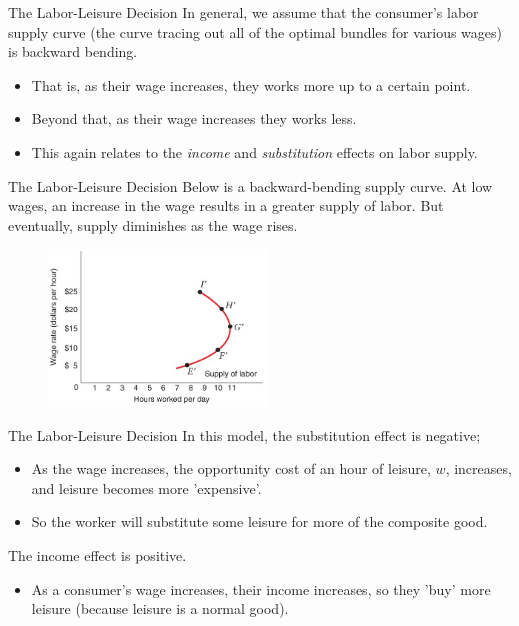 \documentclass[11pt,t]{beamer}
\begin{document}
\begin{frame}{The Labor-Leisure Decision}
  In general, we assume that the consumer's labor supply curve (the curve tracing out all of the optimal bundles for various wages) is backward bending.
  
  \bigskip
  \begin{itemize}
    \item That is, as their wage increases, they works more up to a certain point.

    \item Beyond that, as their wage increases they works less.

    \item This again relates to the \textit{income} and \textit{substitution} effects on labor supply.
  \end{itemize}
\end{frame}

\begin{frame}{The Labor-Leisure Decision}
  Below is a backward-bending supply curve. At low wages, an increase in the wage results in a greater supply of labor. But eventually, supply diminishes as the wage rises.

  \begin{figure}
    \includegraphics[width=220px]{figures/fig5_25.jpg}
  \end{figure}
\end{frame}

\begin{frame}{The Labor-Leisure Decision}
  In this model, the substitution effect is negative;
  
  \bigskip
  \begin{itemize}
    \item As the wage increases, the opportunity cost of an hour of leisure, $w$, increases, and leisure becomes more 'expensive'.

    \item So the worker will substitute some leisure for more of the composite good.
  \end{itemize}
  
  \bigskip\pause
  The income effect is positive.

  \bigskip
  \begin{itemize}
    \item As a consumer's wage increases, their income increases, so they 'buy' more leisure (because leisure is a normal good).
  \end{itemize}
\end{frame}
\end{document}
